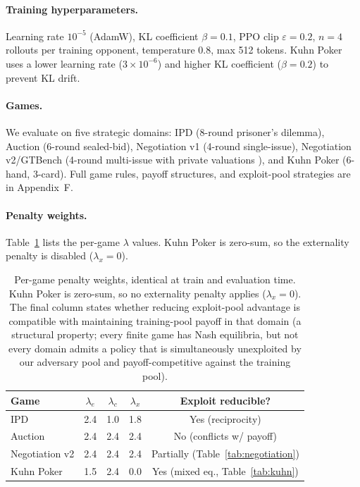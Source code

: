\documentclass[letterpaper]{article} %
\begin{document}
\paragraph{Training hyperparameters.} Learning rate $10^{-5}$ (AdamW), KL coefficient $\beta = 0.1$, PPO clip $\varepsilon = 0.2$, $n = 4$ rollouts per training opponent, temperature $0.8$, max 512 tokens. Kuhn Poker uses a lower learning rate ($3 \times 10^{-6}$) and higher KL coefficient ($\beta = 0.2$) to prevent KL drift.
\paragraph{Games.} We evaluate on five strategic domains: IPD (8-round prisoner's dilemma), Auction (6-round sealed-bid), Negotiation v1 (4-round single-issue), Negotiation v2/GTBench (4-round multi-issue with private valuations \citep{wu2024gtbench}), and Kuhn Poker \citep{kuhn1950simplified} (6-hand, 3-card). Full game rules, payoff structures, and exploit-pool strategies are in Appendix~F.
\paragraph{Penalty weights.} Table~\ref{tab:lambdas} lists the per-game $\lambda$ values. Kuhn Poker is zero-sum, so the externality penalty is disabled ($\lambda_x = 0$).
\begin{table}[t]
\centering
\small
\begin{tabular}{@{}lcccc@{}}
\toprule
\textbf{Game} & $\lambda_e$ & $\lambda_c$ & $\lambda_x$ & \textbf{Exploit reducible?} \\
\midrule
IPD            & 2.4 & 1.0 & 1.8 & Yes (reciprocity) \\
Auction        & 2.4 & 2.4 & 2.4 & No (conflicts w/ payoff) \\
Negotiation v2 & 2.4 & 2.4 & 2.4 & Partially (Table~\ref{tab:negotiation}) \\
Kuhn Poker     & 1.5 & 2.4 & 0.0 & Yes (mixed eq., Table~\ref{tab:kuhn}) \\
\bottomrule
\end{tabular}
\caption{Per-game penalty weights, identical at train and evaluation time. Kuhn Poker is zero-sum, so no externality penalty applies ($\lambda_x = 0$). The final column states whether reducing exploit-pool advantage is compatible with maintaining training-pool payoff in that domain (a structural property; every finite game has Nash equilibria, but not every domain admits a policy that is simultaneously unexploited by our adversary pool and payoff-competitive against the training pool).}
\label{tab:lambdas}
\end{table}
\end{document}
